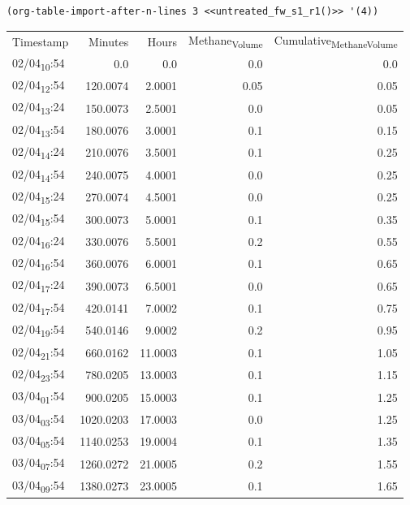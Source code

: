 \documentclass[11pt]{article}
\begin{document}
\begin{verbatim}
(org-table-import-after-n-lines 3 <<untreated_fw_s1_r1()>> '(4))
\end{verbatim}

\begin{center}
\begin{tabular}{lrrrr}
Timestamp & Minutes & Hours & Methane\textsubscript{Volume} & Cumulative\textsubscript{Methane}\textsubscript{Volume}\\[0pt]
02/04\textsubscript{10}:54 & 0.0 & 0.0 & 0.0 & 0.0\\[0pt]
02/04\textsubscript{12}:54 & 120.0074 & 2.0001 & 0.05 & 0.05\\[0pt]
02/04\textsubscript{13}:24 & 150.0073 & 2.5001 & 0.0 & 0.05\\[0pt]
02/04\textsubscript{13}:54 & 180.0076 & 3.0001 & 0.1 & 0.15\\[0pt]
02/04\textsubscript{14}:24 & 210.0076 & 3.5001 & 0.1 & 0.25\\[0pt]
02/04\textsubscript{14}:54 & 240.0075 & 4.0001 & 0.0 & 0.25\\[0pt]
02/04\textsubscript{15}:24 & 270.0074 & 4.5001 & 0.0 & 0.25\\[0pt]
02/04\textsubscript{15}:54 & 300.0073 & 5.0001 & 0.1 & 0.35\\[0pt]
02/04\textsubscript{16}:24 & 330.0076 & 5.5001 & 0.2 & 0.55\\[0pt]
02/04\textsubscript{16}:54 & 360.0076 & 6.0001 & 0.1 & 0.65\\[0pt]
02/04\textsubscript{17}:24 & 390.0073 & 6.5001 & 0.0 & 0.65\\[0pt]
02/04\textsubscript{17}:54 & 420.0141 & 7.0002 & 0.1 & 0.75\\[0pt]
02/04\textsubscript{19}:54 & 540.0146 & 9.0002 & 0.2 & 0.95\\[0pt]
02/04\textsubscript{21}:54 & 660.0162 & 11.0003 & 0.1 & 1.05\\[0pt]
02/04\textsubscript{23}:54 & 780.0205 & 13.0003 & 0.1 & 1.15\\[0pt]
03/04\textsubscript{01}:54 & 900.0205 & 15.0003 & 0.1 & 1.25\\[0pt]
03/04\textsubscript{03}:54 & 1020.0203 & 17.0003 & 0.0 & 1.25\\[0pt]
03/04\textsubscript{05}:54 & 1140.0253 & 19.0004 & 0.1 & 1.35\\[0pt]
03/04\textsubscript{07}:54 & 1260.0272 & 21.0005 & 0.2 & 1.55\\[0pt]
03/04\textsubscript{09}:54 & 1380.0273 & 23.0005 & 0.1 & 1.65\\[0pt]

\end{tabular}
\end{center}
\end{document}
